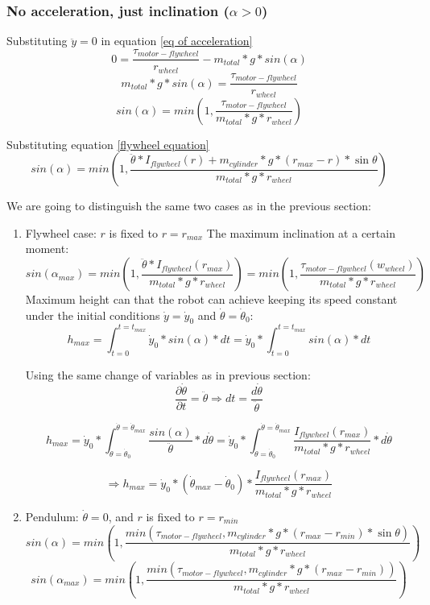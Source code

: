 \subsubsection{No acceleration, just inclination ($\alpha > 0$)}
Substituting $\ddot{y}=0$ in equation \ref{eq of acceleration}
\[0 = \frac{\tau_{motor-flywheel}}{r_{wheel}} - m_{total} * g * sin(\alpha)\]
\[m_{total} * g * sin(\alpha) = \frac{\tau_{motor-flywheel}}{r_{wheel}} \]
\[sin(\alpha) = min(1,\frac{\tau_{motor-flywheel}}{m_{total} * g * r_{wheel}}) \]

Substituting equation \ref{flywheel equation}
\[sin(\alpha) = min(1,\frac{\ddot{\theta}*I_{flywheel}(r) + m_{cylinder} * g * (r_{max} - r) * \sin{\theta}}{m_{total} * g * r_{wheel}}) \]


We are going to distinguish the same two cases as in the previous section:
\begin{enumerate}
    \item Flywheel case: $r$ is fixed to $r = r_{max}$
    The maximum inclination at a certain moment:
    \begin{equation}\label{Maximum angle using flywheel system}
        sin(\alpha_{max}) = min(1,\frac{\ddot{\theta}*I_{flywheel}(r_{max})}{m_{total} * g * r_{wheel}}) = min(1,\frac{\tau_{motor-flywheel}(w_{wheel})}{m_{total} * g * r_{wheel}})
    \end{equation}
    Maximum height can that the robot can achieve keeping its speed constant under the initial conditions $\dot{y}=\dot{y}_0$ and $\dot{\theta}=\dot{\theta}_0$:
    \[h_{max}=\int_{t=0}^{t=t_{max}} \dot{y}_0*sin(\alpha) * dt  = \dot{y}_0* \int_{t=0}^{t=t_{max}} sin(\alpha) * dt\]

    Using the same change of variables as in previous section:    
    \[
    \frac{\partial \dot{\theta}}{\partial t} = \ddot{\theta} \Rightarrow dt = \frac{d\dot{\theta}}{\ddot{\theta}}
    \]

    \[h_{max}= \dot{y}_0* \int_{\dot{\theta}=\dot{\theta}_0}^{\dot{\theta}=\dot{\theta}_{max}} \frac{sin(\alpha)}{\ddot{\theta}} * d\dot{\theta} = \dot{y}_0* \int_{\dot{\theta}=\dot{\theta}_0}^{\dot{\theta}=\dot{\theta}_{max}} \frac{I_{flywheel}(r_{max})}{m_{total} * g * r_{wheel}} * d\dot{\theta}\]


    \[\boxed{\Rightarrow h_{max}= \dot{y}_0* (\dot{\theta}_{max}- \dot{\theta}_0) * \frac{I_{flywheel}(r_{max})}{m_{total} * g * r_{wheel}}}\]

    \item Pendulum: $\dot{\theta} = 0$, and $r$ is fixed to $r = r_{min}$
    \[sin(\alpha) = min(1,\frac{min(\tau_{motor-flywheel},m_{cylinder} * g * (r_{max} - r_{min}) * \sin{\theta})}{m_{total} * g * r_{wheel}}) \]
    \begin{equation}\label{Maximum angle using pendulum system}
        sin(\alpha_{max}) = min(1,\frac{min(\tau_{motor-flywheel},m_{cylinder} * g * (r_{max} - r_{min}))}{m_{total} * g * r_{wheel}})
    \end{equation}
\end{enumerate}

